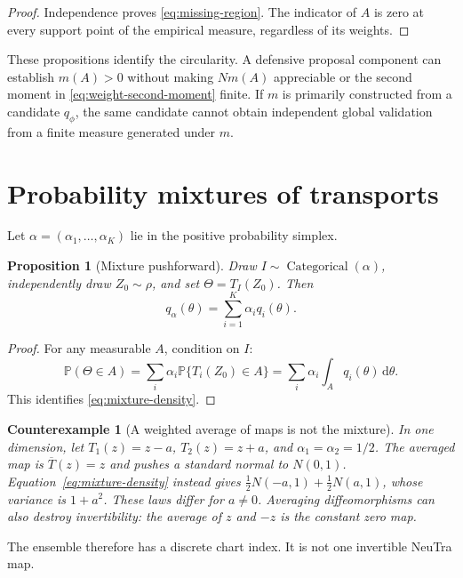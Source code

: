 \documentclass[11pt]{article}
\newtheorem{proposition}[theorem]{Proposition}
\newtheorem{counterexample}[theorem]{Counterexample}
\theoremstyle{definition}
\theoremstyle{remark}
\newcommand{\Prob}{\mathbb{P}}
\newcommand{\Cat}{\operatorname{Categorical}}
\newcommand{\1}{\mathbf{1}}
\newcommand{\dd}{\,\mathrm{d}}
\begin{document}
\begin{proof}
Independence proves \eqref{eq:missing-region}.  The indicator of $A$ is zero at
every support point of the empirical measure, regardless of its weights.
\end{proof}

These propositions identify the circularity.  A defensive proposal component
can establish $m(A)>0$ without making $Nm(A)$ appreciable or the second moment
in \eqref{eq:weight-second-moment} finite.  If $m$ is primarily constructed
from a candidate $q_\phi$, the same candidate cannot obtain independent global
validation from a finite measure generated under $m$.

\section{Probability mixtures of transports}

Let $\alpha=(\alpha_1,\ldots,\alpha_K)$ lie in the positive probability
simplex.

\begin{proposition}[Mixture pushforward]
\label{prop:mixture-pushforward}
Draw $I\sim\Cat(\alpha)$, independently draw $Z_0\sim\rho$, and set
$\Theta=T_I(Z_0)$.  Then
\begin{equation}
 q_\alpha(\theta)=\sum_{i=1}^K\alpha_i q_i(\theta).
 \label{eq:mixture-density}
\end{equation}
\end{proposition}

\begin{proof}
For any measurable $A$, condition on $I$:
\[
 \Prob(\Theta\in A)
 =\sum_i\alpha_i\Prob\{T_i(Z_0)\in A\}
 =\sum_i\alpha_i\int_Aq_i(\theta)\dd\theta.
\]
This identifies \eqref{eq:mixture-density}.
\end{proof}

\begin{counterexample}[A weighted average of maps is not the mixture]
\label{counter:averaged-map}
In one dimension, let $T_1(z)=z-a$, $T_2(z)=z+a$, and
$\alpha_1=\alpha_2=1/2$.  The averaged map is $\overline T(z)=z$ and pushes a
standard normal to $N(0,1)$.  Equation~\eqref{eq:mixture-density} instead gives
$\frac12N(-a,1)+\frac12N(a,1)$, whose variance is $1+a^2$.  These laws differ
for $a\neq0$.  Averaging diffeomorphisms can also destroy invertibility:
the average of $z$ and $-z$ is the constant zero map.
\end{counterexample}

The ensemble therefore has a discrete chart index.  It is not one invertible
NeuTra map.
\end{document}

